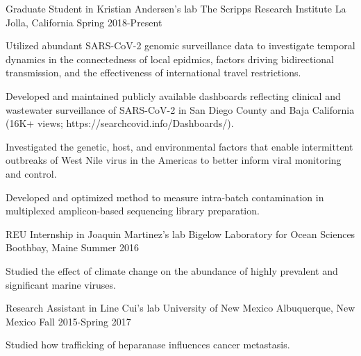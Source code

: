
\begin{cventries}

  \cventry
    {Graduate Student in Kristian Andersen's lab} %
    {The Scripps Research Institute} %
    {La Jolla, California} %
    {Spring 2018-Present} %
    {
      \begin{cvitems} %
        \item {Utilized abundant SARS-CoV-2 genomic surveillance data to investigate temporal dynamics in the connectedness of local epidmics, factors driving bidirectional transmission, and the effectiveness of international travel restrictions.}
        \item {Developed and maintained publicly available dashboards reflecting clinical and wastewater surveillance of SARS-CoV-2 in San Diego County and Baja California (16K+ views; https://searchcovid.info/Dashboards/).}
        \item {Investigated the genetic, host, and environmental factors that enable intermittent outbreaks of West Nile virus in the Americas to better inform viral monitoring and control.}
        \item {Developed and optimized method to measure intra-batch contamination in multiplexed amplicon-based sequencing library preparation.}
      \end{cvitems}
    }

  \cventry
    {REU Internship in Joaquin Martinez's lab} %
    {Bigelow Laboratory for Ocean Sciences} %
    {Boothbay, Maine} %
    {Summer 2016} %
    {
      \begin{cvitems}
        \item{Studied the effect of climate change on the abundance of highly prevalent and significant marine viruses.}
      \end{cvitems}
    }

  \cventry
    {Research Assistant in Line Cui's lab} %
    {University of New Mexico} %
    {Albuquerque, New Mexico} %
    {Fall 2015-Spring 2017} %
    {
      \begin{cvitems}
        \item{Studied how trafficking of heparanase influences cancer metastasis.}
      \end{cvitems}
    }

\end{cventries}
